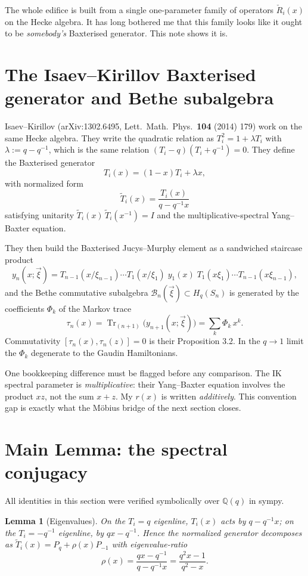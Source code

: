 \documentclass{article}
\newtheorem{lemma}{Lemma}
\theoremstyle{remark}
\newcommand{\Rcheck}{\check{R}}
\newcommand{\Ttilde}{\widetilde{T}}
\newcommand{\Tr}{\operatorname{Tr}}
\begin{document}
The whole edifice is built from a single one-parameter family of operators $\Rcheck_i(x)$ on the Hecke algebra. It has long bothered me that this family looks like it ought to be \emph{somebody's} Baxterised generator. This note shows it is.

\section{The Isaev--Kirillov Baxterised generator and Bethe subalgebra}

Isaev--Kirillov (arXiv:1302.6495, Lett.\ Math.\ Phys.\ \textbf{104} (2014) 179) work on the same Hecke algebra. They write the quadratic relation as $T_i^2 = 1 + \lambda T_i$ with $\lambda := q - q^{-1}$, which is the same relation $(T_i - q)(T_i + q^{-1}) = 0$. They define the Baxterised generator
\[
T_i(x) = (1-x) T_i + \lambda x,
\]
with normalized form
\[
\Ttilde_i(x) = \frac{T_i(x)}{q - q^{-1} x}
\]
satisfying unitarity $\Ttilde_i(x)\, \Ttilde_i(x^{-1}) = I$ and the multiplicative-spectral Yang--Baxter equation.

They then build the Baxterised Jucys--Murphy element as a sandwiched staircase product
\[
y_n(x; \vec\xi) = T_{n-1}(x/\xi_{n-1}) \cdots T_1(x/\xi_1)\; y_1(x)\; T_1(x\xi_1) \cdots T_{n-1}(x\xi_{n-1}),
\]
and the Bethe commutative subalgebra $\mathcal{B}_n(\vec\xi) \subset H_q(S_n)$ is generated by the coefficients $\Phi_k$ of the Markov trace
\[
\tau_n(x) = \Tr_{(n+1)}\!\big( y_{n+1}(x; \vec\xi) \big) = \sum_k \Phi_k\, x^k.
\]
Commutativity $[\tau_n(x), \tau_n(z)] = 0$ is their Proposition 3.2. In the $q \to 1$ limit the $\Phi_k$ degenerate to the Gaudin Hamiltonians.

One bookkeeping difference must be flagged before any comparison. The IK spectral parameter is \emph{multiplicative}: their Yang--Baxter equation involves the product $xz$, not the sum $x + z$. My $r(x)$ is written \emph{additively}. This convention gap is exactly what the M\"obius bridge of the next section closes.

\section{Main Lemma: the spectral conjugacy}

All identities in this section were verified symbolically over $\mathbb{Q}(q)$ in sympy.

\begin{lemma}[Eigenvalues]
On the $T_i = q$ eigenline, $T_i(x)$ acts by $q - q^{-1} x$; on the $T_i = -q^{-1}$ eigenline, by $q x - q^{-1}$. Hence the normalized generator decomposes as $\Ttilde_i(x) = P_q + \rho(x) P_{-1}$ with eigenvalue-ratio
\[
\rho(x) = \frac{q x - q^{-1}}{q - q^{-1} x} = \frac{q^2 x - 1}{q^2 - x}.
\]
\end{lemma}
\end{document}
